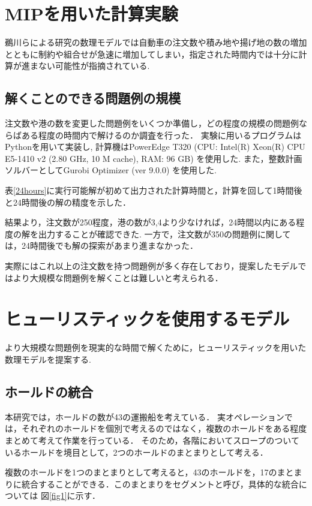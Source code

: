 \documentclass[a4j,11pt,twocolumn]{jsarticle}
\begin{document}
\newpage


\section{MIPを用いた計算実験}
\label {gurobiの計算実験}
鵜川らによる研究の数理モデルでは自動車の注文数や積み地や揚げ地の数の増加とともに制約や組合せが急速に増加してしまい，指定された時間内では十分に計算が進まない可能性が指摘されている.\cite{ukawa}

\subsection{解くことのできる問題例の規模}
注文数や港の数を変更した問題例をいくつか準備し，どの程度の規模の問題例ならばある程度の時間内で解けるのか調査を行った．
実験に用いるプログラムは Pythonを用いて実装し, 計算機はPowerEdge T320 (CPU: Intel(R) Xeon(R) CPU E5-1410 v2 (2.80 GHz, 10 M cache), RAM: 96 GB) を使用した. また，整数計画ソルバーとしてGurobi Optimizer (ver 9.0.0) を使用した.

表\ref{24hours}に実行可能解が初めて出力された計算時間と，計算を回して1時間後と24時間後の解の精度を示した．

結果より，注文数が250程度，港の数が3,4より少なければ，24時間以内にある程度の解を出力することが確認できた.
一方で，注文数が350の問題例に関しては，24時間後でも解の探索があまり進まなかった．

実際にはこれ以上の注文数を持つ問題例が多く存在しており，提案したモデルではより大規模な問題例を解くことは難しいと考えられる．

\section{ヒューリスティックを使用するモデル}
より大規模な問題例を現実的な時間で解くために，ヒューリスティックを用いた数理モデルを提案する.

\subsection{ホールドの統合}
本研究では，ホールドの数が43の運搬船を考えている．
実オペレーションでは，それぞれのホールドを個別で考えるのではなく，複数のホールドをある程度まとめて考えて作業を行っている．
そのため，各階においてスロープのついているホールドを境目として，2つのホールドのまとまりとして考える．

複数のホールドを1つのまとまりとして考えると，43のホールドを，17のまとまりに統合することができる．このまとまりをセグメントと呼び，具体的な統合については
図\ref{fig1}に示す．
\end{document}
